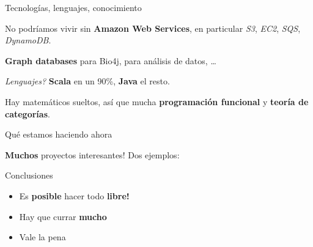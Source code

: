 \documentclass[12pt,compress]{beamer}
\let\OldHref\href
\renewcommand{\href}[2]{\OldHref[pdfnewwindow]{#1}{{\textbf{#2}}}}
\providecommand{\tightlist}{%
\setlength{\itemsep}{0pt}\setlength{\parskip}{0pt}}
\begin{document}
\begin{frame}{Tecnologías, lenguajes, conocimiento}

No podríamos vivir sin \textbf{Amazon Web Services}, en particular
\emph{S3}, \emph{EC2}, \emph{SQS}, \emph{DynamoDB}.

\textbf{Graph databases} para Bio4j, para análisis de datos, \ldots{}

\emph{Lenguajes?} \textbf{Scala} en un 90\%, \textbf{Java} el resto.

Hay matemáticos sueltos, así que mucha \textbf{programación funcional} y
\textbf{teoría de categorías}.

\end{frame}

\begin{frame}{Qué estamos haciendo ahora}

\textbf{Muchos} proyectos interesantes! Dos ejemplos:

\pause


\end{frame}

\begin{frame}{Conclusiones}

\pause

\begin{itemize}[<+->]
\tightlist
\item
  Es \textbf{posible} hacer todo \textbf{libre!}
\item
  Hay que currar \textbf{mucho}
\item
  Vale la pena
\end{itemize}

\end{frame}
\end{document}
